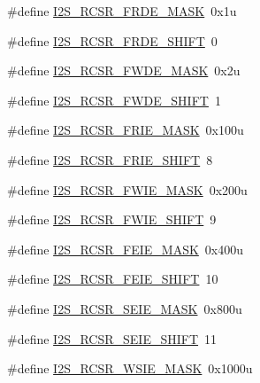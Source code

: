 \begin{DoxyCompactItemize}
\item 
\#define \hyperlink{group___i2_s___register___masks_gaf82cfc347ee6a04baec92ebf5198b06c}{I2\+S\+\_\+\+R\+C\+S\+R\+\_\+\+F\+R\+D\+E\+\_\+\+M\+A\+SK}~0x1u
\item 
\#define \hyperlink{group___i2_s___register___masks_ga989180bd00d082c32921f39944f70c01}{I2\+S\+\_\+\+R\+C\+S\+R\+\_\+\+F\+R\+D\+E\+\_\+\+S\+H\+I\+FT}~0
\item 
\#define \hyperlink{group___i2_s___register___masks_gaba9d1c2766ec4f47df5ea6316e050cd0}{I2\+S\+\_\+\+R\+C\+S\+R\+\_\+\+F\+W\+D\+E\+\_\+\+M\+A\+SK}~0x2u
\item 
\#define \hyperlink{group___i2_s___register___masks_gac9c4253d0b73811583bb620a5f61f1ad}{I2\+S\+\_\+\+R\+C\+S\+R\+\_\+\+F\+W\+D\+E\+\_\+\+S\+H\+I\+FT}~1
\item 
\#define \hyperlink{group___i2_s___register___masks_ga97cd414600a5d5077af214ef0c166dc0}{I2\+S\+\_\+\+R\+C\+S\+R\+\_\+\+F\+R\+I\+E\+\_\+\+M\+A\+SK}~0x100u
\item 
\#define \hyperlink{group___i2_s___register___masks_ga4f7d0729441e65e811ddbcf701db7692}{I2\+S\+\_\+\+R\+C\+S\+R\+\_\+\+F\+R\+I\+E\+\_\+\+S\+H\+I\+FT}~8
\item 
\#define \hyperlink{group___i2_s___register___masks_ga220d8d29a1d3adbf9b2e25b2a0e43fa7}{I2\+S\+\_\+\+R\+C\+S\+R\+\_\+\+F\+W\+I\+E\+\_\+\+M\+A\+SK}~0x200u
\item 
\#define \hyperlink{group___i2_s___register___masks_ga95d98fa004363d636a9d0496cb02772c}{I2\+S\+\_\+\+R\+C\+S\+R\+\_\+\+F\+W\+I\+E\+\_\+\+S\+H\+I\+FT}~9
\item 
\#define \hyperlink{group___i2_s___register___masks_ga52dba3c878ec84f736d69a57424783f8}{I2\+S\+\_\+\+R\+C\+S\+R\+\_\+\+F\+E\+I\+E\+\_\+\+M\+A\+SK}~0x400u
\item 
\#define \hyperlink{group___i2_s___register___masks_ga60c8463f4f1e02e0a0b66e3fcaf4a305}{I2\+S\+\_\+\+R\+C\+S\+R\+\_\+\+F\+E\+I\+E\+\_\+\+S\+H\+I\+FT}~10
\item 
\#define \hyperlink{group___i2_s___register___masks_gadc833e7868c81ddd83a8f22dc03818f2}{I2\+S\+\_\+\+R\+C\+S\+R\+\_\+\+S\+E\+I\+E\+\_\+\+M\+A\+SK}~0x800u
\item 
\#define \hyperlink{group___i2_s___register___masks_ga9347f84652309d5fb61d3ee801a2e5c2}{I2\+S\+\_\+\+R\+C\+S\+R\+\_\+\+S\+E\+I\+E\+\_\+\+S\+H\+I\+FT}~11
\item 
\#define \hyperlink{group___i2_s___register___masks_ga036e89b6f177e5e8345a404813a280a0}{I2\+S\+\_\+\+R\+C\+S\+R\+\_\+\+W\+S\+I\+E\+\_\+\+M\+A\+SK}~0x1000u

\end{DoxyCompactItemize}
